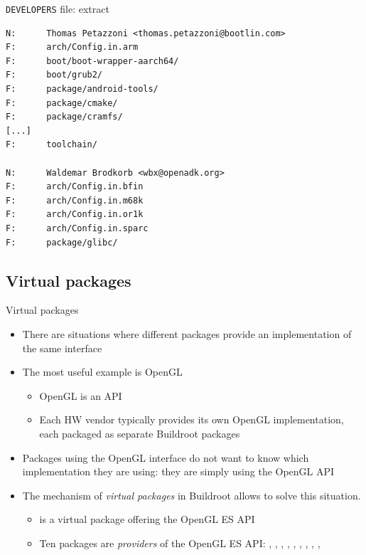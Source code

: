 \begin{frame}[fragile]{{\tt DEVELOPERS} file: extract}
\begin{block}{}
{\tiny
\begin{verbatim}
N:      Thomas Petazzoni <thomas.petazzoni@bootlin.com>
F:      arch/Config.in.arm
F:      boot/boot-wrapper-aarch64/
F:      boot/grub2/
F:      package/android-tools/
F:      package/cmake/
F:      package/cramfs/
[...]
F:      toolchain/

N:      Waldemar Brodkorb <wbx@openadk.org>
F:      arch/Config.in.bfin
F:      arch/Config.in.m68k
F:      arch/Config.in.or1k
F:      arch/Config.in.sparc
F:      package/glibc/
\end{verbatim}
}
\end{block}
\end{frame}

\subsection{Virtual packages}

\begin{frame}{Virtual packages}
  \begin{itemize}
  \item There are situations where different packages provide an
    implementation of the same interface
  \item The most useful example is OpenGL
    \begin{itemize}
    \item OpenGL is an API
    \item Each HW vendor typically provides its own OpenGL
      implementation, each packaged as separate Buildroot packages
    \end{itemize}
  \item Packages using the OpenGL interface do not want to know which
    implementation they are using: they are simply using the OpenGL
    API
  \item The mechanism of {\em virtual packages} in Buildroot allows to
    solve this situation.
    \begin{itemize}
    \item {} is a virtual package offering the OpenGL ES API
    \item Ten packages are {\em providers} of the OpenGL ES API:
      , ,
      , , ,
      , ,
      , , 
    \end{itemize}
  \end{itemize}
\end{frame}

